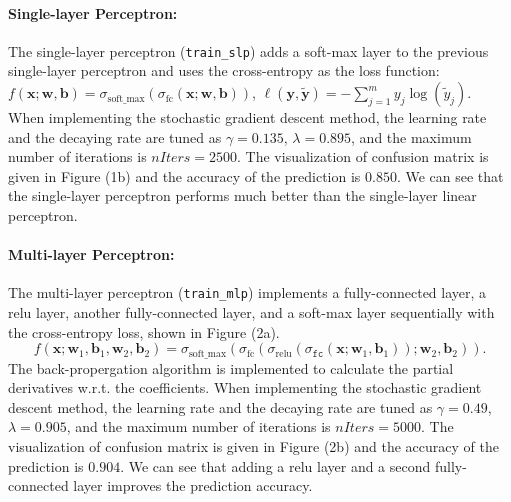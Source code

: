 \documentclass[11pt]{scrartcl}
\begin{document}
\paragraph{\textbf{Single-layer Perceptron:}} 
The single-layer perceptron (\texttt{train\_slp}) adds a soft-max layer to the previous single-layer perceptron and uses the cross-entropy as the loss function: $f(\mathbf{x};\mathbf{w},\mathbf{b})=\sigma_{\text{soft\_max}}(\sigma_{\text{fc}}(\mathbf{x};\mathbf{w},\mathbf{b}))$, $\ell(\mathbf{y},\tilde{\mathbf{y}})=-\sum_{j=1}^{m}y_j\log\left(\tilde{y}_j\right)$. When implementing the stochastic gradient descent method, the learning rate and the decaying rate are tuned as $\gamma=0.135$, $\lambda=0.895$, and the maximum number of iterations is $\textit{nIters}=2500$. The visualization of confusion matrix is given in Figure (1b) and the accuracy of the prediction is  $0.850$. We can see that the single-layer perceptron performs much better than the single-layer linear perceptron.



\paragraph{\textbf{Multi-layer Perceptron:}}
The multi-layer perceptron (\texttt{train\_mlp}) implements a fully-connected layer, a relu layer, another fully-connected layer, and a soft-max layer sequentially with the cross-entropy loss, shown in Figure (2a). $$f(\mathbf{x};\mathbf{w}_1,\mathbf{b}_1,\mathbf{w}_2,\mathbf{b}_2)=\sigma_{\text{soft\_max}}(\sigma_{\text{fc}}(\sigma_{\text{relu}}(\sigma_{\texttt{fc}}(\mathbf{x};\mathbf{w}_1,\mathbf{b}_1));\mathbf{w}_2,\mathbf{b}_2)).
$$
The back-propergation algorithm is implemented to calculate the partial derivatives w.r.t. the coefficients. When implementing the stochastic gradient descent method, the learning rate and the decaying rate are tuned as $\gamma=0.49$, $\lambda=0.905$, and the maximum number of iterations is $\textit{nIters}=5000$. The visualization of confusion matrix is given in Figure (2b) and the accuracy of the prediction is $0.904$. We can see that adding a relu layer and a second fully-connected layer improves the prediction accuracy. 
\end{document}
